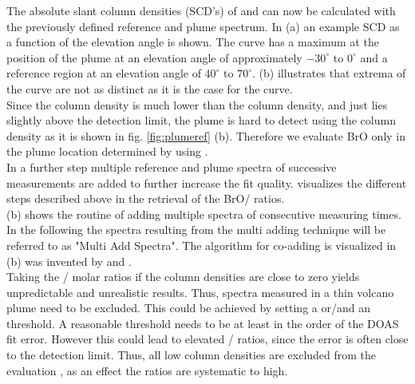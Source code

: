 The absolute slant column densities (SCD's) of   and  can now be calculated with the previously defined reference and plume spectrum.
In  (a) an example  SCD as a function of the elevation angle is shown. The  curve has a maximum at the position of the plume at an elevation angle of approximately $-30^{\circ}$ to $0^{\circ}$  and a reference region at an elevation angle of $40^{\circ}$ to $70^{\circ}$.  (b)  illustrates that  extrema of the   curve are not as distinct as it is the case for the  curve.\\
Since the  column density is much lower than the  column density, and just lies slightly above the detection limit, the plume is hard to detect using the  column density as it is shown in fig. \ref{fig:plumeref} (b). 
Therefore we evaluate BrO only in the plume location determined by using .\\
In a further step multiple reference and plume spectra of successive measurements are added to further increase the fit quality.
 visualizes the different steps described above in the retrieval of the BrO/ ratios.\\
 (b) shows the routine of adding multiple spectra of consecutive measuring times. In the following the spectra resulting from the multi adding technique will be referred to as "Multi Add Spectra". The algorithm for co-adding is visualized in  (b) was invented by \citet{vogel2011volcanic} and \citet{lubcke2014bro}.\\
%
Taking the / molar ratios if the column densities are close to zero yields unpredictable and unrealistic results. Thus, spectra measured in a thin volcano plume need to be excluded.
This could be achieved by setting a  or/and an  threshold. A reasonable  threshold needs to be at least in the order of the DOAS fit error. However this could lead to elevated / ratios, since the  error is often close to the detection limit. Thus, all low  column densities are excluded from the evaluation  \citep{lubcke2014bro}, as an effect the ratios are systematic to high.
%
